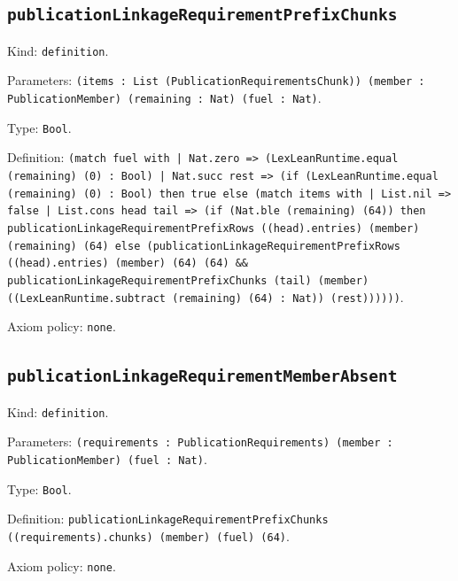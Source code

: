 \documentclass[11pt]{article}
\begin{document}
\subsection*{\texttt{publicationLinkageRequirementPrefixChunks}}
\noindent Kind: \texttt{definition}.\par
\noindent Parameters: \texttt{(items : List (PublicationRequirementsChunk)) (member : PublicationMember) (remaining : Nat) (fuel : Nat)}.\par
\noindent Type: \texttt{Bool}.\par
\noindent Definition: \texttt{(match fuel with | Nat.zero => (LexLeanRuntime.equal (remaining) (0) : Bool) | Nat.succ rest => (if (LexLeanRuntime.equal (remaining) (0) : Bool) then true else (match items with | List.nil => false | List.cons head tail => (if (Nat.ble (remaining) (64)) then publicationLinkageRequirementPrefixRows ((head).entries) (member) (remaining) (64) else (publicationLinkageRequirementPrefixRows ((head).entries) (member) (64) (64) \&\& publicationLinkageRequirementPrefixChunks (tail) (member) ((LexLeanRuntime.subtract (remaining) (64) : Nat)) (rest))))))}.\par
\noindent Axiom policy: \texttt{none}.\par
\subsection*{\texttt{publicationLinkageRequirementMemberAbsent}}
\noindent Kind: \texttt{definition}.\par
\noindent Parameters: \texttt{(requirements : PublicationRequirements) (member : PublicationMember) (fuel : Nat)}.\par
\noindent Type: \texttt{Bool}.\par
\noindent Definition: \texttt{publicationLinkageRequirementPrefixChunks ((requirements).chunks) (member) (fuel) (64)}.\par
\noindent Axiom policy: \texttt{none}.\par
\end{document}
